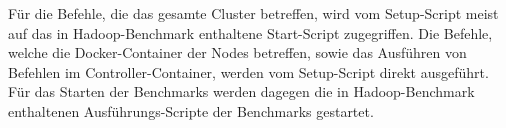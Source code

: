 Für die Befehle, die das gesamte Cluster betreffen, wird vom Setup-Script meist auf das in Hadoop-Benchmark enthaltene Start-Script zugegriffen. Die Befehle, welche die Docker-Container der Nodes betreffen, sowie das Ausführen von Befehlen im Controller-Container, werden vom Setup-Script direkt ausgeführt. Für das Starten der Benchmarks werden dagegen die in Hadoop-Benchmark enthaltenen Ausführungs-Scripte der Benchmarks gestartet.
